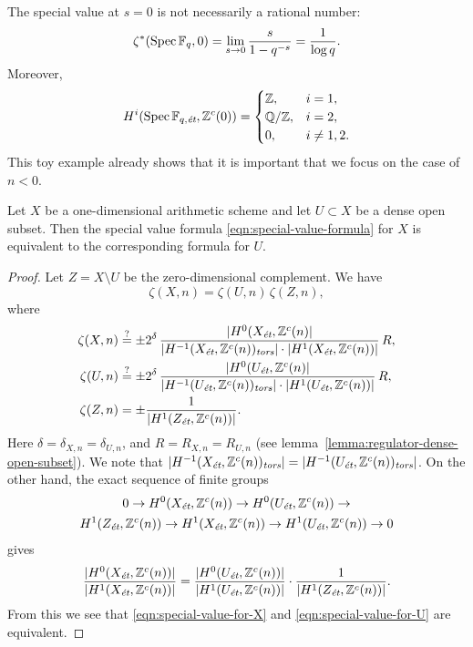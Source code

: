 \documentclass[draft]{article}
\numberwithin{equation}{section}
\begin{document}
\begin{remark}
  The special value at $s = 0$ is not necessarily a rational number:
  \[ \zeta^* (\Spec \FF_q, 0) =
    \lim_{s \to 0} \frac{s}{1 - q^{-s}} =
    \frac{1}{\log q}. \]
  Moreover,
  \[ H^i (\Spec \FF_{q,\et}, \ZZ^c (0)) =
    \begin{cases}
      \ZZ, & i = 1, \\
      \QQ/\ZZ, & i = 2, \\
      0, & i \ne 1,2.
    \end{cases} \]
  This toy example already shows that it is important that we focus on the case
  of $n < 0$.
\end{remark}

\begin{lemma}
  \label{lemma:elementary-proof-2}
  Let $X$ be a one-dimensional arithmetic scheme and let $U \subset X$ be a
  dense open subset. Then the special value formula
  \eqref{eqn:special-value-formula} for $X$ is equivalent to the corresponding
  formula for $U$.

  \begin{proof}
    Let $Z = X\setminus U$ be the zero-dimensional complement. We have
    $$\zeta (X,n) = \zeta (U,n)\,\zeta (Z,n),$$
    where
    \begin{align}
      \label{eqn:special-value-for-X} \zeta (X,n) & \stackrel{?}{=} \pm 2^\delta\,\frac{|H^0 (X_\et, \ZZ^c (n)|}{|H^{-1} (X_\et, \ZZ^c (n))_\tors| \cdot |H^1 (X_\et, \ZZ^c (n))|}\,R, \\
      \label{eqn:special-value-for-U} \zeta (U,n) & \stackrel{?}{=} \pm 2^\delta\,\frac{|H^0 (U_\et, \ZZ^c (n)|}{|H^{-1} (U_\et, \ZZ^c (n))_\tors| \cdot |H^1 (U_\et, \ZZ^c (n))|}\,R, \\
      \notag \zeta (Z,n) & = \pm\frac{1}{|H^1 (Z_\et, \ZZ^c (n))|}.
    \end{align}
    Here $\delta = \delta_{X,n} = \delta_{U,n}$, and $R = R_{X,n} = R_{U,n}$
    (see lemma~\ref{lemma:regulator-dense-open-subset}). We note that
    $|H^{-1} (X_\et, \ZZ^c (n))_\tors| = |H^{-1} (U_\et, \ZZ^c (n))_\tors|$.
    On the other hand, the exact sequence of finite groups
    \begin{multline}
      0 \to H^0 (X_\et, \ZZ^c (n)) \to
      H^0 (U_\et, \ZZ^c (n)) \to \\
      H^1 (Z_\et, \ZZ^c (n)) \to
      H^1 (X_\et, \ZZ^c (n)) \to
      H^1 (U_\et, \ZZ^c (n)) \to 0
    \end{multline}
    gives
    \[ \frac{|H^0 (X_\et, \ZZ^c (n))|}{|H^1 (X_\et, \ZZ^c (n))|} =
      \frac{|H^0 (U_\et, \ZZ^c (n))|}{|H^1 (U_\et, \ZZ^c (n))|}\cdot
      \frac{1}{|H^1 (Z_\et, \ZZ^c (n))|}. \]
    From this we see that \eqref{eqn:special-value-for-X} and
    \eqref{eqn:special-value-for-U} are equivalent.
  \end{proof}
\end{lemma}
\end{document}
